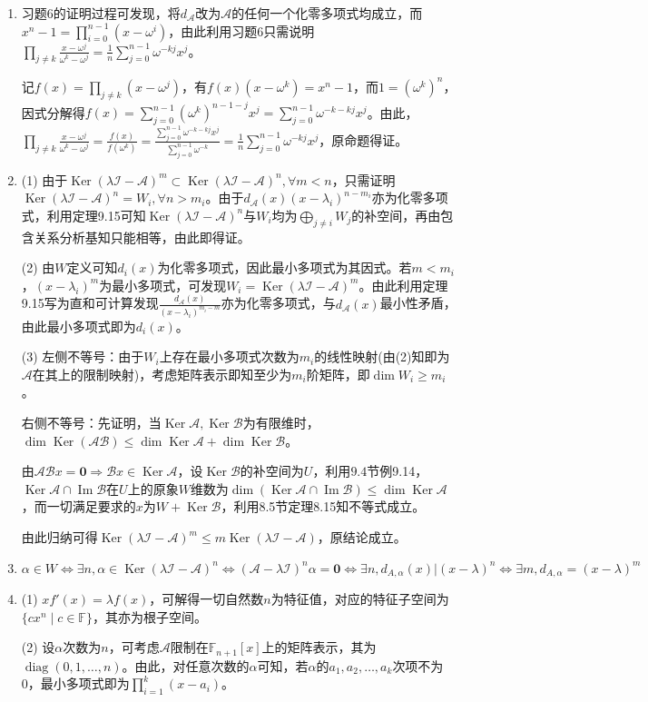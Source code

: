 \documentclass[a4paper,UTF8,fontset=windows]{ctexart}
\DeclareMathOperator{\diag}{diag}
\DeclareMathOperator{\im}{Im}
\DeclareMathOperator{\Ker}{Ker}
\begin{document}
\begin{enumerate}
\item
习题6的证明过程可发现，将$d_\mathcal{A}$改为$\mathcal{A}$的任何一个化零多项式均成立，而$x^n-1=\prod_{i=0}^{n-1}(x-\omega^i)$，由此利用习题6只需说明$\prod_{j\ne k}\frac{x-\omega^j}{\omega^k-\omega^j}=\frac{1}{n}\sum_{j=0}^{n-1}\omega^{-kj}x^j$。

记$f(x)=\prod_{j\ne k}(x-\omega^j)$，有$f(x)(x-\omega^k)=x^n-1$，而$1=(\omega^k)^n$，因式分解得$f(x)=\sum_{j=0}^{n-1}(\omega^k)^{n-1-j}x^j=\sum_{j=0}^{n-1}\omega^{-k-kj}x^j$。由此，$\prod_{j\ne k}\frac{x-\omega^j}{\omega^k-\omega^j}=\frac{f(x)}{f(\omega^k)}=\frac{\sum_{j=0}^{n-1}\omega^{-k-kj}x^j}{\sum_{j=0}^{n-1}\omega^{-k}}=\frac{1}{n}\sum_{j=0}^{n-1}\omega^{-kj}x^j$，原命题得证。

\item
(1) 由于$\Ker(\lambda\mathcal{I}-\mathcal{A})^m\subset\Ker(\lambda\mathcal{I}-\mathcal{A})^n,\forall m<n$，只需证明$\Ker(\lambda\mathcal{I}-\mathcal{A})^n=W_i,\forall n>m_i$。由于$d_\mathcal{A}(x)(x-\lambda_i)^{n-m_i}$亦为化零多项式，利用定理9.15可知$\Ker(\lambda\mathcal{I}-\mathcal{A})^n$与$W_i$均为$\bigoplus_{j\ne i}W_j$的补空间，再由包含关系分析基知只能相等，由此即得证。

(2) 由$W$定义可知$d_i(x)$为化零多项式，因此最小多项式为其因式。若$m<m_i$，$(x-\lambda_i)^m$为最小多项式，可发现$W_i=\Ker(\lambda\mathcal{I}-\mathcal{A})^m$。由此利用定理9.15写为直和可计算发现$\frac{d_\mathcal{A}(x)}{(x-\lambda_i)^{m_i-m}}$亦为化零多项式，与$d_\mathcal{A}(x)$最小性矛盾，由此最小多项式即为$d_i(x)$。

(3) 左侧不等号：由于$W_i$上存在最小多项式次数为$m_i$的线性映射(由(2)知即为$\mathcal{A}$在其上的限制映射)，考虑矩阵表示即知至少为$m_i$阶矩阵，即$\dim W_i\ge m_i$。

右侧不等号：先证明，当$\Ker\mathcal{A},\Ker\mathcal{B}$为有限维时，$\dim\Ker(\mathcal{A}\mathcal{B})\le\dim\Ker\mathcal{A}+\dim\Ker\mathcal{B}$。

由$\mathcal{A}\mathcal{B}x=\mathbf{0}\Rightarrow\mathcal{B}x\in\Ker\mathcal{A}$，设$\Ker\mathcal{B}$的补空间为$U$，利用$9.4$节例9.14，$\Ker\mathcal{A}\cap\im\mathcal{B}$在$U$上的原象$W$维数为$\dim(\Ker\mathcal{A}\cap\im\mathcal{B})\le\dim\Ker\mathcal{A}$，而一切满足要求的$x$为$W+\Ker\mathcal{B}$，利用8.5节定理8.15知不等式成立。

由此归纳可得$\Ker(\lambda\mathcal{I}-\mathcal{A})^m\le m\Ker(\lambda\mathcal{I}-\mathcal{A})$，原结论成立。

\item
$\alpha\in W\Leftrightarrow\exists n,\alpha\in\Ker(\lambda\mathcal{I}-\mathcal{A})^n\Leftrightarrow(\mathcal{A}-\lambda\mathcal{I})^n\alpha=\mathbf{0}\Leftrightarrow\exists n,d_{A,\alpha}(x)|(x-\lambda)^n\Leftrightarrow\exists m,d_{A,\alpha}=(x-\lambda)^m$

\item
(1) $xf'(x)=\lambda f(x)$，可解得一切自然数$n$为特征值，对应的特征子空间为$\{cx^n\mid c\in\mathbb{F}\}$，其亦为根子空间。

(2) 设$\alpha$次数为$n$，可考虑$\mathcal{A}$限制在$\mathbb{F}_{n+1}[x]$上的矩阵表示，其为$\diag(0,1,\dots,n)$。由此，对任意次数的$\alpha$可知，若$\alpha$的$a_1,a_2,\dots,a_k$次项不为0，最小多项式即为$\prod_{i=1}^k(x-a_i)$。
\end{enumerate}
\end{document}

